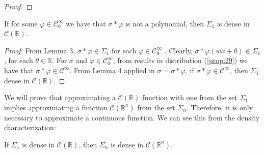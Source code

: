 \documentclass[../main.tex]{subfiles}
\begin{document}
\begin{proof}
		
	\end{proof}
	
	\begin{lema} %
		If for some $\varphi \in \mathcal{C}^\infty_0 $ we have that $\sigma \ast \varphi $ is not a polynomial, then $\Sigma_1$ is dense in $\mathcal{C}(\mathbb{R})$.
	\end{lema}
	 \begin{proof}
	 From Lemma 3, $\sigma \ast \varphi \in  \overline{\Sigma_1}$ for each $\varphi \in \mathcal{C}^\infty_0$ . Clearly, $\sigma \ast \varphi (wx+\theta ) \in  \overline{\Sigma_1}$, for each $\theta \in \mathbb{R}$. For $\sigma$ and $\varphi \in \mathcal{C}^\infty_0$, from results in distribution (\ref{prop:29}) we have that $\sigma \ast \varphi \in  \mathcal{C}^\infty $.
	 From Lemma 4 applied in $\sigma= \sigma \ast \varphi$, if $\sigma \ast \varphi \in  \mathcal{C}^\infty $, then $\Sigma_1$ dense in $\mathcal{C} (\mathbb{R})$. 
	 \end{proof}
 
 \noindent We will prove that approximating a $\mathcal{C}(\mathbb{R})$ function  with one from the set $\Sigma_1$ implies approximating a function $\mathcal{C}(\mathbb{R}^n)$ from the set $\Sigma_n$. Therefore, it is only necessary to approximate a continuous function. We can see this from the density characterization:

	\begin{lema}  %
			If $\Sigma_1$ is dense in $\mathcal{C}(\mathbb{R})$, then $\Sigma_n$ is dense in $\mathcal{C}(\mathbb{R}^n)$. 
		\end{lema}
	
\end{document}
